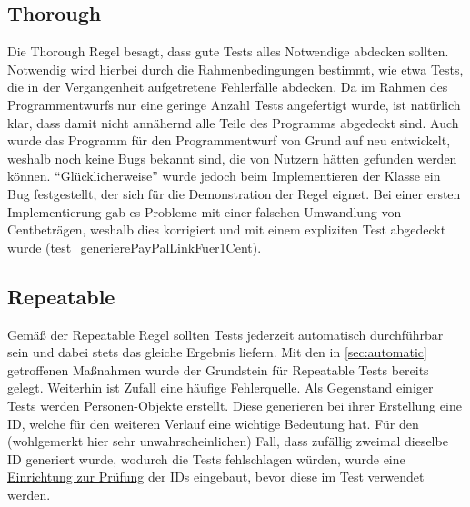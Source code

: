 \subsection{Thorough}
Die Thorough Regel besagt, dass gute Tests alles Notwendige abdecken sollten.
Notwendig wird hierbei durch die Rahmenbedingungen bestimmt, wie etwa Tests, die in der Vergangenheit aufgetretene Fehlerfälle abdecken.
Da im Rahmen des Programmentwurfs nur eine geringe Anzahl Tests angefertigt wurde, ist natürlich klar, dass damit nicht annähernd alle Teile des Programms abgedeckt sind.
Auch wurde das Programm für den Programmentwurf von Grund auf neu entwickelt, weshalb noch keine Bugs bekannt sind, die von Nutzern hätten gefunden werden können.
\enquote{Glücklicherweise} wurde jedoch beim Implementieren der Klasse  ein Bug festgestellt, der sich für die Demonstration der Regel eignet.
Bei einer ersten Implementierung gab es Probleme mit einer falschen Umwandlung von Centbeträgen, weshalb dies korrigiert und mit einem expliziten Test abgedeckt wurde (\href{https://github.com/yschiebelhut/carpool-java/blob/6d938e78763ca42270aafb8f51de4104c88e558a/0-carpool-java-integration/src/test/java/paypal/PayPalLinkBuilderTest.java#L27}{test\_generierePayPalLinkFuer1Cent}).

\subsection{Repeatable}
Gemäß der Repeatable Regel sollten Tests jederzeit automatisch durchführbar sein und dabei stets das gleiche Ergebnis liefern.
Mit den in \autoref{sec:automatic} getroffenen Maßnahmen wurde der Grundstein für Repeatable Tests bereits gelegt.
Weiterhin ist Zufall eine häufige Fehlerquelle.
Als Gegenstand einiger Tests werden Personen-Objekte erstellt.
Diese generieren bei ihrer Erstellung eine ID, welche für den weiteren Verlauf eine wichtige Bedeutung hat.
Für den (wohlgemerkt hier sehr unwahrscheinlichen) Fall, dass zufällig zweimal dieselbe ID generiert wurde, wodurch die Tests fehlschlagen würden, wurde eine \href{https://github.com/yschiebelhut/carpool-java/blob/6d938e78763ca42270aafb8f51de4104c88e558a/0-carpool-java-plugin-json/src/test/java/speicher/JsonPersonRepositoryTest.java#L132}{Einrichtung zur Prüfung} der IDs eingebaut, bevor diese im Test verwendet werden.

